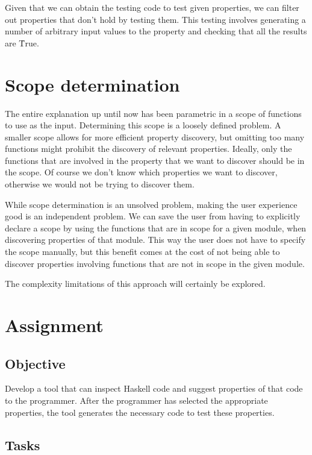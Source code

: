 \documentclass[a4paper, 11pt, onepage]{article}
\begin{document}
Given that we can obtain the testing code to test given properties, we can filter out properties that don't hold by testing them.
This testing involves generating a number of arbitrary input values to the property and checking that all the results are \h{True}.


\section{Scope determination}

The entire explanation up until now has been parametric in a scope of functions to use as the input.
Determining this scope is a loosely defined problem.
A smaller scope allows for more efficient property discovery, but omitting too many functions might prohibit the discovery of relevant properties.
Ideally, only the functions that are involved in the property that we want to discover should be in the scope.
Of course we don't know which properties we want to discover, otherwise we would not be trying to discover them.

While scope determination is an unsolved problem, making the user experience good is an independent problem.
We can save the user from having to explicitly declare a scope by using the functions that are in scope for a given module, when discovering properties of that module.
This way the user does not have to specify the scope manually, but this benefit comes at the cost of not being able to discover properties involving functions that are not in scope in the given module.

The complexity limitations of this approach will certainly be explored. 


\section{Assignment}

\subsection{Objective}

Develop a tool that can inspect Haskell code and suggest properties of that code to the programmer.
After the programmer has selected the appropriate properties, the tool generates the necessary code to test these properties.


\subsection{Tasks}
\end{document}

